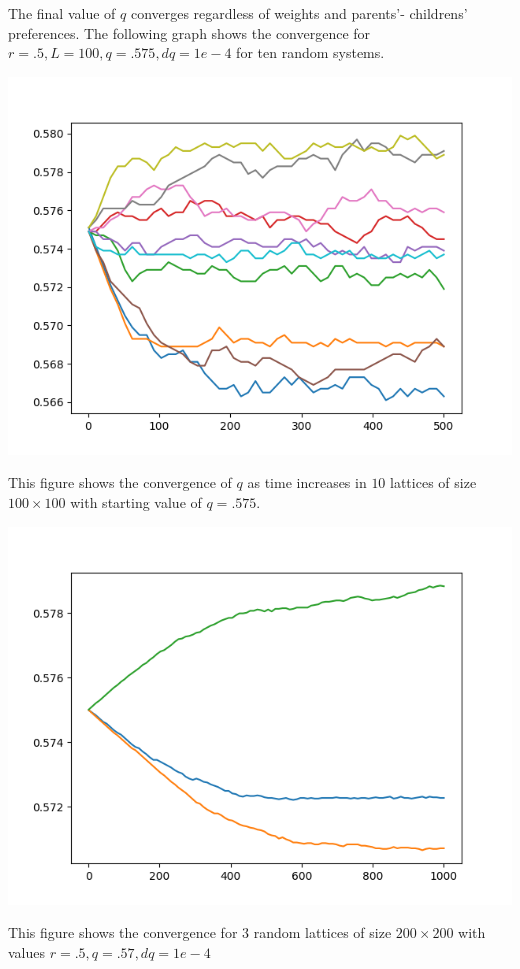 \documentclass[article, 11pt, a4paper, onesize]{memoir}
\begin{document}
The final value of \(q\) converges regardless of weights and parents'- childrens' preferences.
The following graph shows the convergence for \(r=.5, L=100, q=.575, dq=1e-4\) for ten random systems.

\begin{center}
    \includegraphics[scale=0.6]{q_converges_L100_q575_r5_num10_dq1e-4.png}

    This figure shows the convergence of \(q\) as time increases in \(10\) lattices
    of size \(100\times 100\) with starting value of \(q=.575\).
\end{center}

\begin{center}
    \includegraphics[scale=0.6]{q_converges_L200_q575_r5_num3_dq1e-5.png}

    This figure shows the convergence for \(3\) random lattices of size \(200\times 200\)
    with values \(r=.5, q=.57, dq = 1e-4\)
\end{center}
\end{document}
